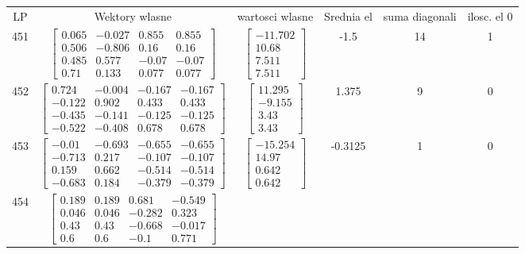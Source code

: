 \documentclass[a4paper,12pt]{article}
\begin{document}
\bgroup {} \vspace{0.2in} \begin{tabular}{c c c c c c}
LP &Wektory wlasne & wartosci wlasne & Srednia el & suma diagonali & ilosc. el 0\\
451
&
$\begin{bmatrix} 0.065 & -0.027 & 0.855 & 0.855 \\ 0.506 & -0.806 & 0.16 & 0.16 \\ 0.485 & 0.577 & -0.07 & -0.07 \\ 0.71 & 0.133 & 0.077 & 0.077 \end{bmatrix}$
&
$\begin{bmatrix} -11.702 \\ 10.68 \\ 7.511 \\ 7.511 \end{bmatrix}$
&
-1.5
&
14
&
1
\\
452
&
$\begin{bmatrix} 0.724 & -0.004 & -0.167 & -0.167 \\ -0.122 & 0.902 & 0.433 & 0.433 \\ -0.435 & -0.141 & -0.125 & -0.125 \\ -0.522 & -0.408 & 0.678 & 0.678 \end{bmatrix}$
&
$\begin{bmatrix} 11.295 \\ -9.155 \\ 3.43 \\ 3.43 \end{bmatrix}$
&
1.375
&
9
&
0
\\
453
&
$\begin{bmatrix} -0.01 & -0.693 & -0.655 & -0.655 \\ -0.713 & 0.217 & -0.107 & -0.107 \\ 0.159 & 0.662 & -0.514 & -0.514 \\ -0.683 & 0.184 & -0.379 & -0.379 \end{bmatrix}$
&
$\begin{bmatrix} -15.254 \\ 14.97 \\ 0.642 \\ 0.642 \end{bmatrix}$
&
-0.3125
&
1
&
0
\\
454
&
$\begin{bmatrix} 0.189 & 0.189 & 0.681 & -0.549 \\ 0.046 & 0.046 & -0.282 & 0.323 \\ 0.43 & 0.43 & -0.668 & -0.017 \\ 0.6 & 0.6 & -0.1 & 0.771 \end{bmatrix}$

\end{tabular}
\end{document}

